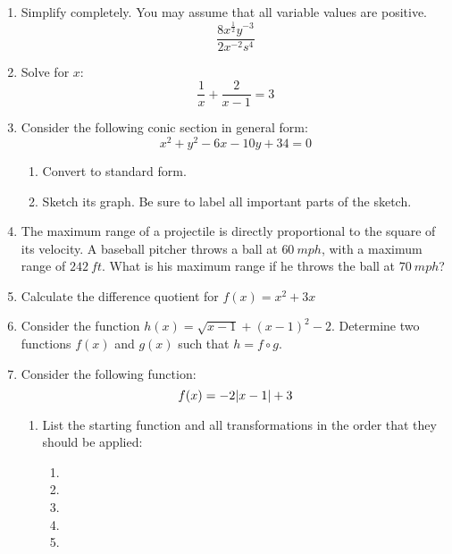 \documentclass[letterpaper,12pt,fleqn]{article}
\begin{document}
\newpage

\begin{enumerate}

\item Simplify completely. You may assume that all variable values are
  positive.
  \[\frac{8x^{\frac{1}{2}}y^{-3}}{2x^{-2}s^4}\]

  \vspace{3in}

\item Solve for $x$:
  \[\frac{1}{x}+\frac{2}{x-1}=3\]

  \newpage

\item Consider the following conic section in general form:
  \[x^2+y^2-6x-10y+34=0\]
  \begin{enumerate}
  \item Convert to standard form.

    \vspace{3in}

  \item Sketch its graph. Be sure to label all important parts of the sketch.

  \end{enumerate}

  \newpage

\item The maximum range of a projectile is directly proportional to the
  square of its velocity. A baseball pitcher throws a ball at $\SI{60}{mph}$,
  with a maximum range of $\SI{242}{ft}$. What is his maximum range if he
  throws the ball at $\SI{70}{mph}$?

  \vspace{3in}

\item Calculate the difference quotient for $f(x)=x^2+3x$

  \vspace{3in}

\item Consider the function $h(x)=\sqrt{x-1}+(x-1)^2-2$. Determine two
  functions $f(x)$ and $g(x)$ such that $h=f\circ g$.

  \newpage

\item Consider the following function:
  \[f(x)=-2\lvert x-1\rvert+3\]
  \begin{enumerate}
  \item List the starting function and all transformations in the order
    that they should be applied:
    \begin{enumerate}
    \item
    \item
    \item
    \item
    \item
    \end{enumerate}


\end{enumerate}
\end{enumerate}
\end{document}
